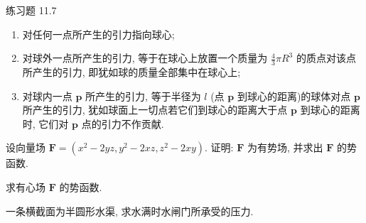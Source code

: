 \begin{exblock}{练习题 11.7}
\begin{enumerate}[label=(\arabic*),leftmargin=2.6em,itemsep=0.15\baselineskip,topsep=0.2\baselineskip]
  \item 对任何一点所产生的引力指向球心;

  \item 对球外一点所产生的引力, 等于在球心上放置一个质量为 $\frac{4}{3}\pi R^{3}$ 的质点对该点所产生的引力, 即犹如球的质量全部集中在球心上;

  \item 对球内一点 $\boldsymbol{p}$ 所产生的引力, 等于半径为 $l$ (点 $\boldsymbol{p}$ 到球心的距离)的球体对点 $\boldsymbol{p}$ 所产生的引力, 犹如球面上一切点若它们到球心的距离大于点 $\boldsymbol{p}$ 到球心的距离时, 它们对 $\boldsymbol{p}$ 点的引力不作贡献.

  \end{enumerate}

\item 设向量场 $\boldsymbol{F}=(x^{2}-2yz,y^{2}-2xz,z^{2}-2xy)$. 证明: $\boldsymbol{F}$ 为有势场, 并求出 $\boldsymbol{F}$ 的势函数.

\item 求有心场 $\boldsymbol{F}$ 的势函数.

\item 一条横截面为半圆形水渠, 求水满时水闸门所承受的压力.
\end{exblock}

